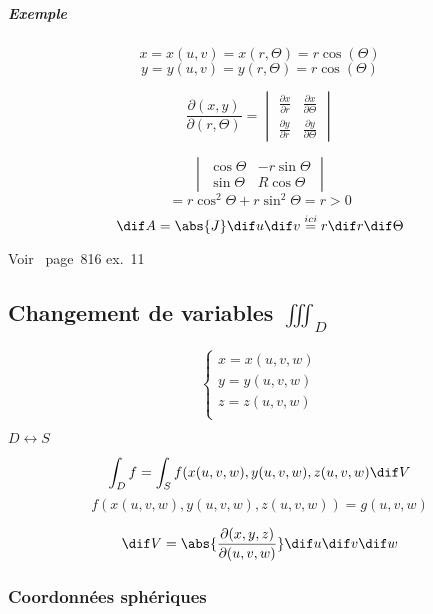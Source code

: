 \subparagraph{Exemple}



$$x=x(u,v)=x(r,\Theta)=r\cos(\Theta)$$
$$y=y(u,v)=y(r,\Theta)=r\cos(\Theta)$$





\[
\frac{\partial (x,y)}{\partial (r, \Theta)} =
\begin{vmatrix}
\frac{\partial x}{\partial r}& \frac{\partial x}{\partial \Theta}\\
\frac{\partial y}{\partial r}& \frac{\partial y}{\partial \Theta}
\end{vmatrix}
\]

$$\begin{vmatrix}
\cos\Theta & -r\sin\Theta\\
\sin\Theta & R\cos\Theta
\end{vmatrix}$$
\[=r\cos^2\Theta +r\sin^2\Theta = r > 0\]
$$\dif A = \abs{J}\dif u\dif v \overset{ici}{=}r \dif r \dif\Theta $$

\begin{myrem}

Voir~\cite{adams2013calculus} page~816 ex.~11 %
\end{myrem}

\subsection{Changement de variables $ \iiint_D $}
$$
\left\{
\begin{array}{l}
x=x(u,v,w)\\
y=y(u,v,w)\\
z=z(u,v,w)\\
\end{array}
\right.
$$

$D \longleftrightarrow S $

\[\int_D f = \int_S f (x(u,v,w),y(u,v,w),z(u,v,w) \dif V\]
\[f (x(u,v,w),y(u,v,w),z(u,v,w)) = g(u,v,w)\]

\[\dif V=\abs{\frac{\partial(x,y,z)}{\partial(u,v,w)}}\dif u\dif v\dif w\]



\subsubsection{Coordonnées sphériques}

